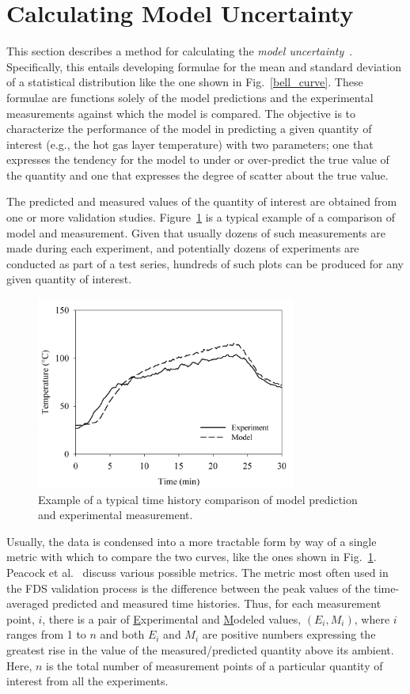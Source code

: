 \section{Calculating Model Uncertainty}

This section describes a method for calculating the {\em model uncertainty}~\cite{McGrattan:Metrologia}. Specifically, this entails developing formulae for the mean and standard deviation of a statistical distribution like the one shown in Fig.~\ref{bell_curve}. These formulae are functions solely of the model predictions and the experimental measurements against which the model is compared. The objective is to characterize the performance of the model in predicting a given quantity of interest (e.g., the hot gas layer temperature) with two parameters; one that expresses the tendency for the model to under or over-predict the true value of the quantity and one that expresses the degree of scatter about the true value.

The predicted and measured values of the quantity of interest are obtained from one or more validation studies. Figure~\ref{temp_history} is a typical example of a comparison of model and measurement. Given that usually dozens of such measurements are made during each experiment, and potentially dozens of experiments are conducted as part of a test series, hundreds of such plots can be produced for any given quantity of interest.
\begin{figure}[ht]
\begin{center}
\includegraphics[height=2.5in]{FIGURES/sample_time_history}
\end{center}
\caption[Sample time history plots.]{Example of a typical time history comparison of model prediction and experimental measurement.}
\label{temp_history}
\end{figure}
Usually, the data is condensed into a more tractable form by way of a single metric with which to compare the two curves, like the ones shown in Fig.~\ref{temp_history}. Peacock et al.~\cite{Peacock:FSJ1999} discuss various possible metrics. The metric most often used in the FDS validation process is the difference between the peak values of the time-averaged predicted and measured time histories. Thus, for each measurement point, $i$, there is a pair of \underline{E}xperimental and \underline{M}odeled values, $(E_i,M_i)$, where $i$ ranges from 1 to $n$ and both $E_i$ and $M_i$ are positive numbers expressing the greatest rise in the value of the measured/predicted quantity above its ambient. Here, $n$ is the total number of measurement points of a particular quantity of interest from all the experiments.

